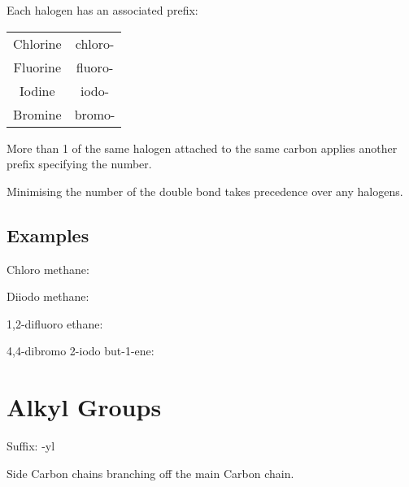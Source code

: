 \documentclass[a4paper,11pt]{article}
\begin{document}
Each halogen has an associated prefix:

\begin{center}
\begin{tabular}{c|c}
Chlorine & chloro- \\
Fluorine & fluoro- \\
Iodine   & iodo-   \\
Bromine  & bromo-  \\
\end{tabular}
\end{center}

More than 1 of the same halogen attached to the same carbon applies another
prefix specifying the number.

Minimising the number of the double bond takes precedence over any halogens.


\subsection{Examples}

Chloro methane:

\begin{center}
\end{center}

Diiodo methane:

\begin{center}
\end{center}

1,2-difluoro ethane:

\begin{center}
\end{center}

4,4-dibromo 2-iodo but-1-ene:

\begin{center}
\end{center}



\section{Alkyl Groups}

Suffix: -yl

Side Carbon chains branching off the main Carbon chain.
\end{document}
